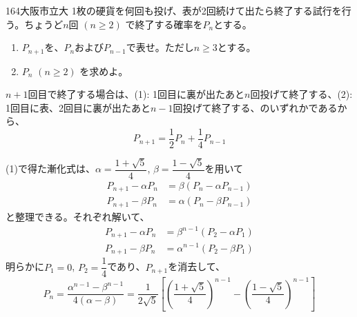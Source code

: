 \begin{prob}{164}{}{大阪市立大}
 1枚の硬貨を何回も投げ、表が2回続けて出たら終了する試行を行う。ちょうど$n$回 $(n\ge 2)$ で終了する確率を$P_n$とする。
 \begin{enumerate}
  \item $P_{n+1}$を、$P_n$および$P_{n-1}$で表せ。ただし$n\ge 3$とする。
  \item $P_n$ $(n\ge 2)$ を求めよ。
 \end{enumerate}
\end{prob}

$n+1$回目で終了する場合は、(1): 1回目に裏が出たあと$n$回投げて終了する、(2): 1回目に表、2回目に裏が出たあと$n-1$回投げて終了する、のいずれかであるから、
\[ P_{n+1}=\frac{1}{2}P_n+\frac{1}{4}P_{n-1} \]

(1)で得た漸化式は、$\alpha=\dfrac{1+\sqrt{5}}{4}$, $\beta=\dfrac{1-\sqrt{5}}{4}$を用いて
\begin{align*}
 P_{n+1}-\alpha P_n&=\beta(P_n-\alpha P_{n-1}) \\
 P_{n+1}-\beta P_n&=\alpha(P_n-\beta P_{n-1}) 
\end{align*}
と整理できる。それぞれ解いて、
\begin{align*}
 P_{n+1}-\alpha P_n&=\beta^{n-1}(P_2-\alpha P_1) \\
 P_{n+1}-\beta P_n&=\alpha^{n-1}(P_2-\beta P_1)
\end{align*}
明らかに$P_1=0$, $P_2=\dfrac{1}{4}$であり、$P_{n+1}$を消去して、
\[ P_n=\frac{\alpha^{n-1}-\beta^{n-1}}{4(\alpha-\beta)}=\frac{1}{2\sqrt{5}}\left[\left(\frac{1+\sqrt{5}}{4}\right)^{n-1}\!\!-\left(\frac{1-\sqrt{5}}{4}\right)^{n-1}\right] \]
